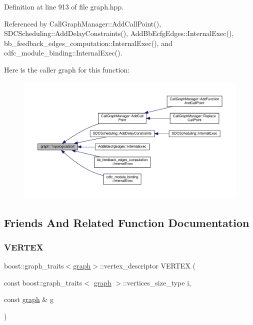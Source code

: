 Definition at line 913 of file graph.\+hpp.



Referenced by Call\+Graph\+Manager\+::\+Add\+Call\+Point(), S\+D\+C\+Scheduling\+::\+Add\+Delay\+Constraints(), Add\+Bb\+Ecfg\+Edges\+::\+Internal\+Exec(), bb\+\_\+feedback\+\_\+edges\+\_\+computation\+::\+Internal\+Exec(), and cdfc\+\_\+module\+\_\+binding\+::\+Internal\+Exec().

Here is the caller graph for this function\+:
\nopagebreak
\begin{figure}[H]
\begin{center}
\leavevmode
\includegraphics[width=350pt]{d5/d15/structgraph_a2466f852a8a9baf976f010474c7a5e03_icgraph}
\end{center}
\end{figure}


\subsection{Friends And Related Function Documentation}
\mbox{\label{structgraph_aa5c4339fe865e05a4ce7a067012a9bb5}} 
\subsubsection{\texorpdfstring{V\+E\+R\+T\+EX}{VERTEX}}
{\footnotesize\ttfamily boost\+::graph\+\_\+traits$<$\hyperlink{structgraph}{graph}$>$\+::vertex\+\_\+descriptor V\+E\+R\+T\+EX (\begin{DoxyParamCaption}\item[{const boost\+::graph\+\_\+traits$<$ \hyperlink{structgraph}{graph} $>$\+::vertices\+\_\+size\+\_\+type}]{i,  }\item[{const \hyperlink{structgraph}{graph} \&}]{g }\end{DoxyParamCaption})\hspace{0.3cm}{\ttfamily [friend]}}



